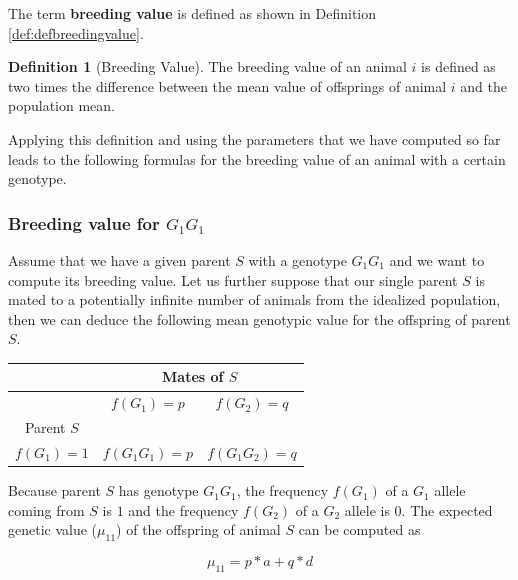 \documentclass[
]{book}
\theoremstyle{definition}
\newtheorem{definition}{Definition}[chapter]
\theoremstyle{definition}
\theoremstyle{definition}
\theoremstyle{remark}
\begin{document}
The term \textbf{breeding value} is defined as shown in Definition \ref{def:defbreedingvalue}.

\begin{definition}[Breeding Value]
\protect\hypertarget{def:defbreedingvalue}{}{\label{def:defbreedingvalue} {} }The breeding value of an animal \(i\) is defined as two times the difference between the mean value of offsprings of animal \(i\) and the population mean.
\end{definition}

Applying this definition and using the parameters that we have computed so far leads to the following formulas for the breeding value of an animal with a certain genotype.

\hypertarget{breeding-value-for-g_1g_1}{%
\subsubsection{\texorpdfstring{Breeding value for \(G_1G_1\)}{Breeding value for G\_1G\_1}}\label{breeding-value-for-g_1g_1}}

Assume that we have a given parent \(S\) with a genotype \(G_1G_1\) and we want to compute its breeding value. Let us further suppose that our single parent \(S\) is mated to a potentially infinite number of animals from the idealized population, then we can deduce the following mean genotypic value for the offspring of parent \(S\).

\vspace{5ex}

\begin{tabular}{|c|c|c|}
\hline
& \multicolumn{2}{|c|}{Mates of $S$} \\
\hline
& $f(G_1) = p$       &  $f(G_2) = q$   \\
\hline
Parent $S$       &                    &                 \\
\hline
$f(G_1) = 1$ &  $f(G_1G_1) = p$   &  $f(G_1G_2) = q$\\
\hline
\end{tabular}

\vspace{5ex}

Because parent \(S\) has genotype \(G_1G_1\), the frequency \(f(G_1)\) of a \(G_1\) allele coming from \(S\) is \(1\) and the frequency \(f(G_2)\) of a \(G_2\) allele is 0. The expected genetic value (\(\mu_{11}\)) of the offspring of animal \(S\) can be computed as

\begin{equation}
\mu_{11} = p*a + q*d
\label{eq:MeanOffGen11}
\end{equation}
\end{document}
